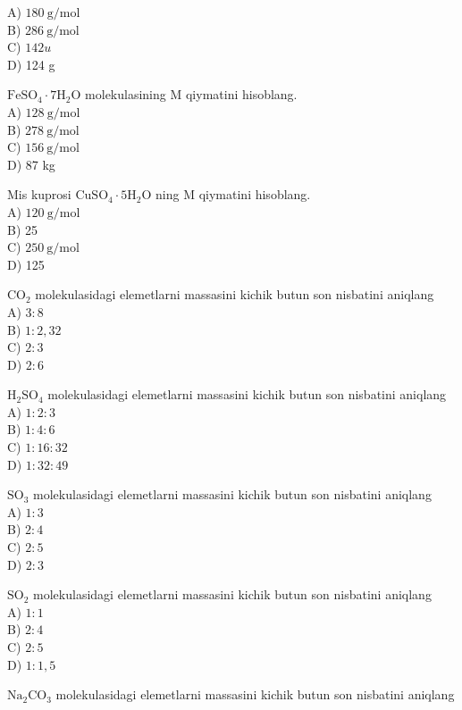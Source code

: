 A) $180 \mathrm{~g} / \mathrm{mol}$\\
B) $286 \mathrm{~g} / \mathrm{mol}$\\
C) $142 u$\\
D) 124 g
  \item $\mathrm{FeSO}_{4} \cdot 7 \mathrm{H}_{2} \mathrm{O}$ molekulasining M qiymatini hisoblang.\\
A) $128 \mathrm{~g} / \mathrm{mol}$\\
B) $278 \mathrm{~g} / \mathrm{mol}$\\
C) $156 \mathrm{~g} / \mathrm{mol}$\\
D) 87 kg
  \item Mis kuprosi $\mathrm{CuSO}_{4} \cdot 5 \mathrm{H}_{2} \mathrm{O}$ ning M qiymatini hisoblang.\\
A) $120 \mathrm{~g} / \mathrm{mol}$\\
B) 25\\
C) $250 \mathrm{~g} / \mathrm{mol}$\\
D) 125
  \item $\mathrm{CO}_{2}$ molekulasidagi elemetlarni massasini kichik butun son nisbatini aniqlang\\
A) $3: 8$\\
B) $1: 2,32$\\
C) $2: 3$\\
D) $2: 6$
  \item $\mathrm{H}_{2} \mathrm{SO}_{4}$ molekulasidagi elemetlarni massasini kichik butun son nisbatini aniqlang\\
A) $1: 2: 3$\\
B) $1: 4: 6$\\
C) $1: 16: 32$\\
D) $1: 32: 49$
  \item $\mathrm{SO}_{3}$ molekulasidagi elemetlarni massasini kichik butun son nisbatini aniqlang\\
A) $1: 3$\\
B) $2: 4$\\
C) $2: 5$\\
D) $2: 3$
  \item $\mathrm{SO}_{2}$ molekulasidagi elemetlarni massasini kichik butun son nisbatini aniqlang\\
A) $1: 1$\\
B) $2: 4$\\
C) $2: 5$\\
D) $1: 1,5$
  \item $\mathrm{Na}_{2} \mathrm{CO}_{3}$ molekulasidagi elemetlarni massasini kichik butun son nisbatini aniqlang\\
